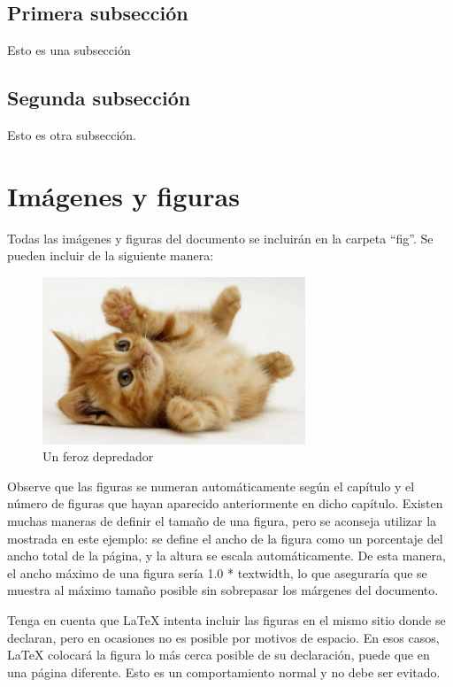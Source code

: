 \subsection{Primera subsección}\label{sec:subseccion}
Esto es una subsección

\subsection{Segunda subsección}
Esto es otra subsección.

\section{Imágenes y figuras}
Todas las imágenes y figuras del documento se incluirán en la carpeta ``fig''. Se pueden incluir de la siguiente manera:

\begin{figure}[htp]
    \centering
    \includegraphics[width=0.7\textwidth]{fig/ejemplo.png}
    \caption{Un feroz depredador}
    \label{fig:ejemplo}
\end{figure}

Observe que las figuras se numeran automáticamente según el capítulo y el número de figuras que hayan aparecido anteriormente en dicho capítulo. Existen muchas maneras de definir el tamaño de una figura, pero se aconseja utilizar la mostrada en este ejemplo: se define el ancho de la figura como un porcentaje del ancho total de la página, y la altura se escala automáticamente. De esta manera, el ancho máximo de una figura sería 1.0 * textwidth, lo que aseguraría que se muestra al máximo tamaño posible sin sobrepasar los márgenes del documento.

Tenga en cuenta que LaTeX intenta incluir las figuras en el mismo sitio donde se declaran, pero en ocasiones no es posible por motivos de espacio. En esos casos, LaTeX colocará la figura lo más cerca posible de su declaración, puede que en una página diferente. Esto es un comportamiento normal y no debe ser evitado.

